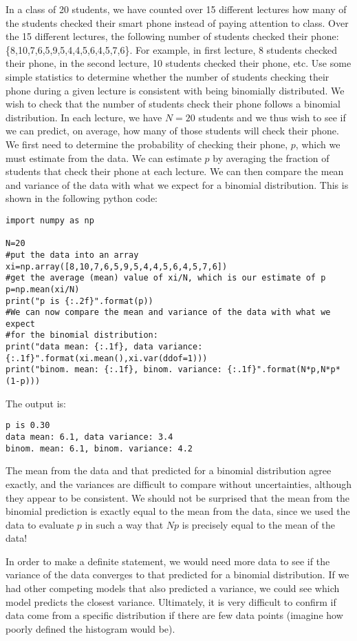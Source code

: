 \begin{example}{}{In a class of 20 students, we have counted over 15 different lectures how many of the students checked their smart phone instead of paying attention to class. Over the 15 different lectures, the following number of students checked their phone: \{8,10,7,6,5,9,5,4,4,5,6,4,5,7,6\}. For example, in first lecture, 8 students checked their phone, in the second lecture, 10 students checked their phone, etc. Use some simple statistics to determine whether the number of students checking their phone during a given lecture is consistent with being binomially distributed.}{}
\label{ex:BinomialPhones}
We wish to check that the number of students check their phone follows a binomial distribution. In each lecture, we have $N=20$ students and we thus wish to see if we can predict, on average, how many of those students will check their phone. We first need to determine the probability of checking their phone, $p$, which we must estimate from the data. We can estimate $p$ by averaging the fraction of students that check their phone at each lecture. We can then compare the mean and variance of the data with what we expect for a binomial distribution. This is shown in the following python code:
\begin{lstlisting}[frame=single] 
import numpy as np

N=20
#put the data into an array
xi=np.array([8,10,7,6,5,9,5,4,4,5,6,4,5,7,6])
#get the average (mean) value of xi/N, which is our estimate of p
p=np.mean(xi/N)
print("p is {:.2f}".format(p))
#We can now compare the mean and variance of the data with what we expect 
#for the binomial distribution:
print("data mean: {:.1f}, data variance: {:.1f}".format(xi.mean(),xi.var(ddof=1)))
print("binom. mean: {:.1f}, binom. variance: {:.1f}".format(N*p,N*p*(1-p)))
\end{lstlisting}
The output is:
\begin{verbatim}
p is 0.30
data mean: 6.1, data variance: 3.4
binom. mean: 6.1, binom. variance: 4.2
\end{verbatim}
The mean from the data and that predicted for a binomial distribution agree exactly, and the variances are difficult to compare without uncertainties, although they appear to be consistent. We should not be surprised that the mean from the binomial prediction is exactly equal to the mean from the data, since we used the data to evaluate $p$ in such a way that $Np$ is precisely equal to the mean of the data!

In order to make a definite statement, we would need more data to see if the variance of the data converges to that predicted for a binomial distribution. If we had other competing models that also predicted a variance, we could see which model predicts the closest variance. Ultimately, it is very difficult to confirm if data come from a specific distribution if there are few data points (imagine how poorly defined the histogram would be).


\end{example}
